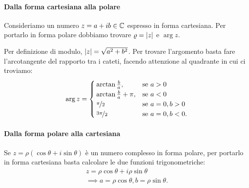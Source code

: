 \paragraph{Dalla forma cartesiana alla polare} Consideriamo un numero $z = a+ib \in \C$ espresso in forma cartesiana. Per portarlo in forma polare dobbiamo trovare $\rho = \abs*{z}$ e $\arg z$.

Per definizione di modulo, $\abs*{z} = \sqrt{a^2 + b^2}$. Per trovare l'argomento basta fare l'arcotangente del rapporto tra i cateti, facendo attenzione al quadrante in cui ci troviamo:
\begin{equation}\label{eq:argument}
    \arg z = \begin{cases}
        \arctan \frac{b}{a}, &\text{se } a > 0 \\
        \arctan \frac{b}{a} + \pi, &\text{se } a < 0 \\
        \nicefrac{\pi}{2} &\text{se } a = 0, b > 0\\
        \nicefrac{3\pi}{2} &\text{se } a = 0, b < 0.
    \end{cases}    
\end{equation}
\paragraph{Dalla forma polare alla cartesiana} Se $z = \rho(\cos\theta +i\sin\theta)$ è un numero complesso in forma polare, per portarlo in forma cartesiana basta calcolare le due funzioni trigonometriche: \begin{align*}
    z = \rho\cos\theta + i\rho\sin\theta\\
    \implies a = \rho\cos\theta, b = \rho\sin\theta.
\end{align*}

